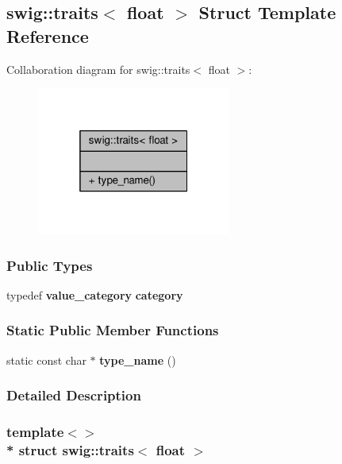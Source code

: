 \subsection{swig\+:\+:traits$<$ float $>$ Struct Template Reference}
\label{structswig_1_1traits_3_01float_01_4}


Collaboration diagram for swig\+:\+:traits$<$ float $>$\+:
\nopagebreak
\begin{figure}[H]
\begin{center}
\leavevmode
\includegraphics[width=181pt]{da/dc9/structswig_1_1traits_3_01float_01_4__coll__graph}
\end{center}
\end{figure}
\subsubsection*{Public Types}
\begin{DoxyCompactItemize}
\item 
typedef {\bf value\+\_\+category} {\bf category}
\end{DoxyCompactItemize}
\subsubsection*{Static Public Member Functions}
\begin{DoxyCompactItemize}
\item 
static const char $\ast$ {\bf type\+\_\+name} ()
\end{DoxyCompactItemize}


\subsubsection{Detailed Description}
\subsubsection*{template$<$$>$\\*
struct swig\+::traits$<$ float $>$}




